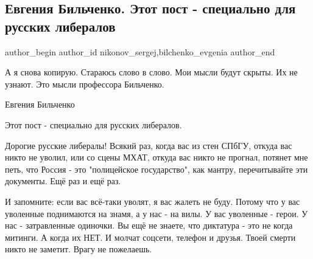  
 
 
 
 
 
\subsection{Евгения Бильченко. Этот пост - специально для русских либералов}
\label{sec:08_09_2021.fb.nikonov_sergej.2.bilchenko_rossia_liberaly}
 
\ifcmt
 author_begin
   author_id nikonov_sergej,bilchenko_evgenia
 author_end
\fi

А я снова копирую. Стараюсь слово в слово. Мои мысли будут скрыты. Их не
узнают. Это мысли профессора Бильченко.

Евгения Бильченко

Этот пост - специально для русских либералов.

Дорогие русские либералы! Всякий раз, когда вас из стен СПбГУ, откуда вас никто
не уволил, или со сцены МХАТ, откуда вас никто не прогнал, потянет мне петь,
что Россия - это "полицейское государство", как мантру, перечитывайте эти
документы. Ещё раз и ещё раз.

И запомните: если вас всё-таки уволят, я вас жалеть не буду. Потому что у вас
уволенные поднимаются на знамя, а у нас - на вилы. У вас уволенные - герои. У
нас - затравленные одиночки. Вы ещё не знаете, что диктатура - это не когда
митинги. А когда их НЕТ. И молчат соцсети, телефон и друзья. Твоей смерти никто
не заметит. Врагу не пожелаешь.


